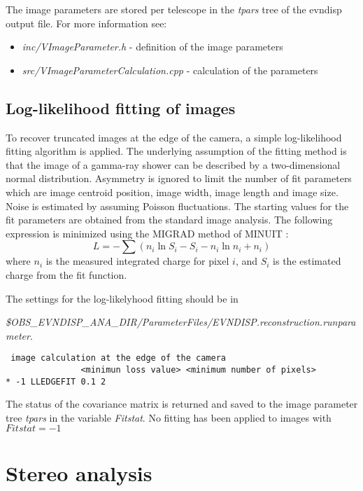 \documentclass[titlepage,a4paper,twoside,11pt]{report}
\begin{document}
The image parameters are stored per telescope in the {\it tpars} tree of the evndisp output file. For more information see: 
\begin{itemize}
\item {\it inc/VImageParameter.h} - definition of the image parameters
\item {\it src/VImageParameterCalculation.cpp} - calculation of the parameters 
\end{itemize}

\subsection{Log-likelihood fitting of images}

To recover truncated images at the edge of the camera, a simple log-likelihood fitting algorithm is applied. The underlying assumption of the fitting method is that the image of a gamma-ray shower can be described by a two-dimensional normal distribution. Asymmetry is ignored to limit the number of fit parameters which are image centroid position, image width, image length and image size. Noise is estimated by assuming Poisson fluctuations. The starting values for the fit parameters are obtained from the standard image analysis. The following expression is minimized using the MIGRAD method of MINUIT \cite{MINUIT}: 
\begin{equation}
L = - \sum (n_i \ln S_i - S_i - n_i \ln n_i + n_i)
\end{equation}
where $n_i$ is the measured integrated charge for pixel $i$, and $S_i$ is the estimated charge from the fit function. 


The settings for the log-likelyhood fitting should be in 

{\it \$OBS\_EVNDISP\_ANA\_DIR/ParameterFiles/EVNDISP.reconstruction.runparameter}.

\begin{lstlisting}
 image calculation at the edge of the camera 
               <minimun loss value> <minimum number of pixels>
* -1 LLEDGEFIT 0.1 2
\end{lstlisting}

The status of the covariance matrix is returned and saved to the image parameter tree {\it tpars} in the variable {\it Fitstat}. 
No fitting has been applied to images with $Fitstat=-1$ 


\section{Stereo analysis}
\end{document}
